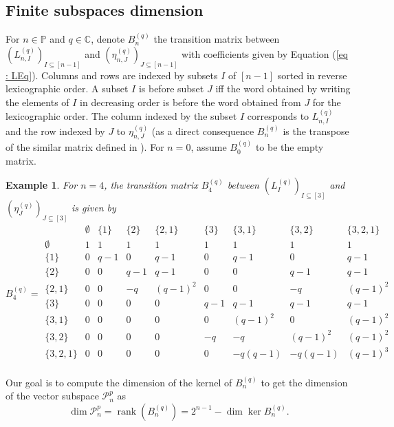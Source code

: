 \documentclass[submission]{FPSAC2023}
\newtheorem{example}{Example}
\newcommand{\CC}{\mathbb{C}} %
\newcommand{\PP}{\mathbb{P}} %
\newcommand{\rank}{\operatorname{rank}}
\begin{document}
\subsection{Finite subspaces dimension}
\label{section.dimension}
For $n \in \PP$ and $q \in \CC$, denote $B_n^{(q)}$ the transition matrix between $(L_{n, I}^{(q)})_{I \subseteq [n-1]}$ and $(\eta^{(q)}_{n, J})_{J \subseteq [n-1]}$ with coefficients given by Equation (\ref{eq : LEq}). Columns and rows are indexed by subsets $I$ of $[n-1]$ sorted in reverse lexicographic order. A subset $I$ is before subset $J$ iff the word obtained by writing the elements of $I$ in decreasing order is before the word obtained from $J$ for the lexicographic order. The column indexed by the subset $I$ corresponds to $L_{n, I}^{(q)}$ and the row indexed by $J$ to $\eta^{(q)}_{n, J}$ (as a direct consequence $B_n^{(q)}$ is the transpose of the similar matrix defined in \cite{GriVas22}). For $n=0$, assume $B_0^{(q)}$ to be the empty matrix. 
\begin{example} 
For $n=4$, the transition matrix $B_{4}^{(q)}$ between $(L_{I}^{(q)})_{I \subseteq [3]}$ and $(\eta^{(q)}_{J})_{J \subseteq [3]}$ is given by
\begin{equation*}
B_{4}^{(q)} = 
\begin{array}{c|cccccccc}
 & \emptyset & \{1\} & \{2\} &  \{2, 1\} & \{3\} &  \{3, 1\}& \{3, 2\} &  \{3, 2, 1\}\\
 \hline
 \emptyset & 1 & 1 & 1 & 1 & 1 & 1 & 1 & 1\\
\{1\} & 0 & q-1 & 0 & q-1 & 0 & q-1 & 0 & q-1\\
\{2\} & 0 & 0 & q-1 & q-1 & 0 & 0 & q-1 & q-1\\
\{2, 1\} & 0 & 0 & -q & (q-1)^2 & 0 & 0 & -q & (q-1)^2\\
\{3\} & 0 & 0 & 0 & 0 & q-1 & q-1 & q-1 & q-1\\
\{3, 1\} & 0 & 0 & 0 & 0 & 0 & (q-1)^2 & 0 & (q-1)^2 \\
\{3, 2\} & 0 & 0 & 0 & 0 & -q & -q & (q-1)^2 & (q-1)^2\\
\{3,2,1\} & 0 & 0 & 0 & 0 & 0 & -q(q-1) & -q(q-1) & (q-1)^3\\
\end{array}
\end{equation*}
\end{example}
Our goal is to compute the dimension of the kernel of $B_n^{(q)}$ to get the dimension of the vector subspace $\mathcal{P}^p_n$ as $$\dim \mathcal{P}^p_n = \rank(B_n^{(q)}) = 2^{n-1} - \dim \ker B_n^{(q)}.$$
\end{document}
